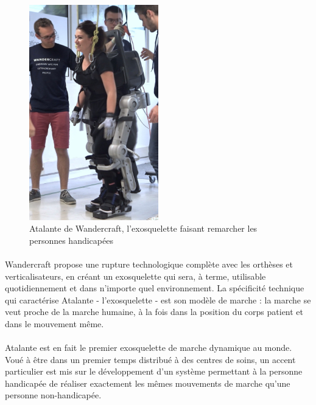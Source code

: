 \documentclass[a4paper,10pt]{article}
\begin{document}
                \begin{figure}[h!]
                    \centering
                    \includegraphics[width=0.5\textwidth]{wandercraft-exosquelette.jpg}
                    \caption{Atalante de Wandercraft, l'exosquelette faisant remarcher les personnes handicapées}
                    \label{fig:wdc}
                \end{figure}
                
                \paragraph{}
                    Wandercraft propose une rupture technologique complète avec les orthèses 
                    et verticalisateurs, en créant un exosquelette qui sera, à terme, utilisable 
                    quotidiennement et dans n'importe quel environnement. La spécificité technique qui 
                    caractérise Atalante - l'exosquelette - est son modèle de marche : 
                    la marche se veut proche de la marche humaine, à la fois dans la position 
                    du corps patient et dans le mouvement même. 
                    
                \paragraph{}
                    Atalante est en fait le premier exosquelette de marche dynamique au 
                    monde. Voué à être dans un premier temps distribué à des centres de 
                    soins, un accent particulier est mis sur le développement d'un système 
                    permettant à la personne handicapée de réaliser exactement les mêmes mouvements 
                    de marche qu'une personne non-handicapée. 
                    
\end{document}
